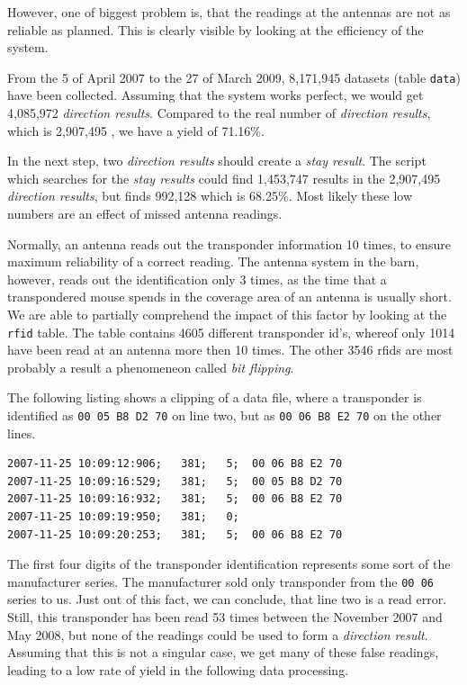 However, one of biggest problem is, that the readings at the antennas are not as reliable as planned. This is clearly visible by looking at the efficiency of the system.

From the 5 of April 2007 to the 27 of March 2009, 8,171,945 datasets (table \lstinline|data|) have been collected. Assuming that the system works perfect, we would get 4,085,972 \textit{direction results}. Compared to the real number of \textit{direction results}, which is 2,907,495 , we have a yield of 71.16\%.

In the next step, two \textit{direction results} should create a \textit{stay result}. The script which searches for the \textit{stay results} could find 1,453,747 results in the 2,907,495 \textit{direction results}, but finds 992,128 which is 68.25\%. Most likely these low numbers are an effect of missed antenna readings.

Normally, an antenna reads out the transponder information 10 times, to ensure maximum reliability of a correct reading. The antenna system in the barn, however, reads out the identification only 3 times, as the time that a transpondered mouse spends in the coverage area of an antenna is usually short. We are able to partially comprehend the impact of this factor by looking at the \lstinline|rfid| table. The table contains 4605 different transponder id's, whereof only 1014 have been read at an antenna more then 10 times. The other 3546 rfids are most probably a result a phenomeneon called \textit{bit flipping}.

The following listing shows a clipping of a data file, where a transponder is identified as \lstinline|00 05 B8 D2 70| on line two, but as \lstinline|00 06 B8 E2 70| on the other lines. 

\numcodestyle
\begin{lstlisting}[frame=none]
2007-11-25 10:09:12:906;   381;   5;  00 06 B8 E2 70
2007-11-25 10:09:16:529;   381;   5;  00 05 B8 D2 70
2007-11-25 10:09:16:932;   381;   5;  00 06 B8 E2 70
2007-11-25 10:09:19:950;   381;   0; 
2007-11-25 10:09:20:253;   381;   5;  00 06 B8 E2 70
\end{lstlisting}

The first four digits of the transponder identification represents some sort of the manufacturer series. The manufacturer sold only transponder from the \lstinline|00 06| series to us. Just out of this fact, we can conclude, that line two is a read error. Still, this transponder has been read 53 times between the November 2007 and May 2008, but none of the readings could be used to form a \textit{direction result}. Assuming that this is not a singular case, we get many of these false readings, leading to a low rate of yield in the following data processing. 


